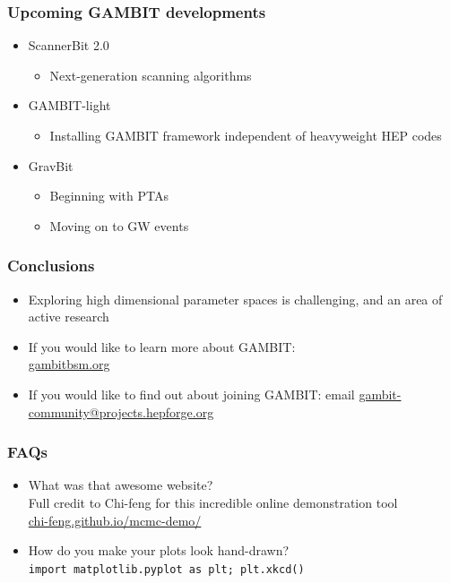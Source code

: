 \documentclass[aspectratio=169]{beamer}
\begin{document}
\begin{frame}
    \frametitle{Upcoming GAMBIT developments}
    \begin{itemize}
        \item ScannerBit 2.0
            \begin{itemize}
                \item Next-generation scanning algorithms
            \end{itemize}
        \item GAMBIT-light
            \begin{itemize}
                \item Installing GAMBIT framework independent of heavyweight HEP codes
            \end{itemize}
        \item GravBit
            \begin{itemize}
                \item Beginning with PTAs
                \item Moving on to GW events
            \end{itemize}
    \end{itemize}
\end{frame}


\begin{frame}
    \frametitle{Conclusions}
    \begin{itemize}
        \item Exploring high dimensional parameter spaces is challenging, and an area of active research
        \item If you would like to learn more about GAMBIT:\\
            \href{https://gambitbsm.org/}{gambitbsm.org}
        \item If you would like to find out about joining GAMBIT:
            email \href{mailto:gambit-community@projects.hepforge.org}{gambit-community@projects.hepforge.org}
    \end{itemize}
\end{frame}

\appendix
\begin{frame}
    \frametitle{FAQs}
    
    \begin{itemize}
    \item What was that awesome website? \\
    \hfill Full credit to Chi-feng for this incredible online demonstration tool\\
    \hfill \href{https://chi-feng.github.io/mcmc-demo/}{chi-feng.github.io/mcmc-demo/}

    \item How do you make your plots look hand-drawn? \\
        \hfill \texttt{import matplotlib.pyplot as plt; plt.xkcd()}
    \end{itemize}
\end{frame}
\end{document}
